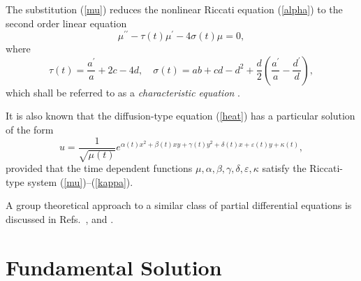 \documentclass[12pt,reqno]{amsart}
\theoremstyle{plain}
\numberwithin{equation}{section}
\begin{document}
The substitution (\ref{mu}) reduces the nonlinear Riccati equation (\ref{alpha}) to the second order linear equation\begin{equation}
\mu ^{\prime \prime }-\tau \left( t\right) \mu ^{\prime }-4\sigma \left(
t\right) \mu =0,  \label{charequation}
\end{equation}where\begin{equation}
\tau \left( t\right) =\frac{a^{\prime }}{a}+2c-4d,\quad \sigma \left(
t\right) =ab+cd-d^{2}+\frac{d}{2}\left( \frac{a^{\prime }}{a}-\frac{d^{\prime }}{d}\right) ,  \label{SigTau}
\end{equation}which shall be referred to as a \textit{characteristic equation} \cite{SuazoSusVega10}.

It is also known \cite{SuazoSusVega10} that the diffusion-type equation (\ref{heat}) has a particular solution of the form\begin{equation}
u=\frac{1}{\sqrt{\mu \left( t\right) }}e^{\alpha \left( t\right) x^{2}+\beta
\left( t\right) xy+\gamma \left( t\right) y^{2}+\delta \left( t\right)
x+\varepsilon \left( t\right) y+\kappa \left( t\right) },
\label{partsolution}
\end{equation}provided that the time dependent functions $\mu ,\alpha ,\beta ,\gamma
,\delta ,\varepsilon ,\kappa $ satisfy the Riccati-type system (\ref{mu})--(\ref{kappa}).

A group theoretical approach to a similar class of partial differential
equations is discussed in Refs.~\cite{GagWint93}, \cite{Miller77} and \cite{Rosen76}.

\section{Fundamental Solution}
\end{document}
